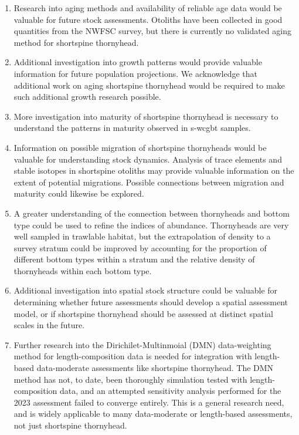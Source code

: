 \documentclass[11pt,
  english,
  letterpaper,
]{article}
\providecommand{\tightlist}{%
  \setlength{\itemsep}{0pt}\setlength{\parskip}{0pt}}
\providecommand{\tightlist}{%
  \setlength{\itemsep}{0pt}\setlength{\parskip}{0pt}}
\begin{document}
\begin{enumerate}
\def\labelenumi{\arabic{enumi}.}
\tightlist
\item
  Research into aging methods and availability of reliable age data would be valuable for future stock assessments. Otoliths have been collected in good quantities from the NWFSC survey, but there is currently no validated aging method for shortspine thornyhead.
\item
  Additional investigation into growth patterns would provide valuable information for future population projections. We acknowledge that additional work on aging shortspine thornyhead would be required to make such additional growth research possible.
\item
  More investigation into maturity of shortspine thornyhead is necessary to understand the patterns in maturity observed in \gls{s-wcgbt} samples.
\item
  Information on possible migration of shortspine thornyheads would be valuable for understanding stock dynamics. Analysis of trace elements and stable isotopes in shortspine otoliths may provide valuable information on the extent of potential migrations. Possible connections between migration and maturity could likewise be explored.
\item
  A greater understanding of the connection between thornyheads and bottom type could be used to refine the indices of abundance. Thornyheads are very well sampled in trawlable habitat, but the extrapolation of density to a survey stratum could be improved by accounting for the proportion of different bottom types within a stratum and the relative density of thornyheads within each bottom type.
\item
  Additional investigation into spatial stock structure could be valuable for determining whether future assessments should develop a spatial assessment model, or if shortspine thornyhead should be assessed at distinct spatial scales in the future.
\item
  Further research into the Dirichilet-Multinmoial (DMN) data-weighting method for length-composition data is needed for integration with length-based data-moderate assessments like shortspine thornyhead. The DMN method has not, to date, been thoroughly simulation tested with length-composition data, and an attempted sensitivity analysis performed for the 2023 assessment failed to converge entirely. This is a general research need, and is widely applicable to many data-moderate or length-based assessments, not just shortspine thornyhead.
\end{enumerate}
\end{document}
